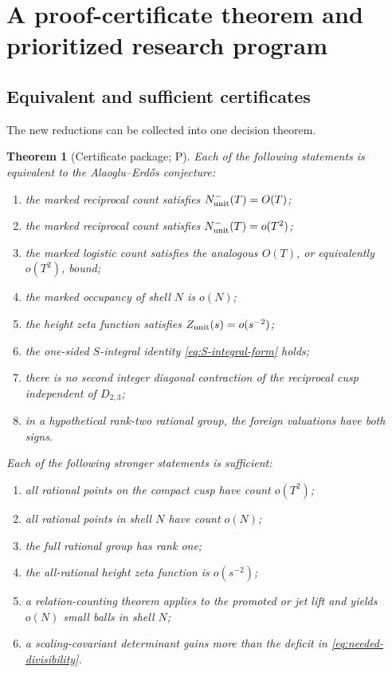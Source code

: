 \documentclass[10pt,oneside]{article}
\newtheorem{theorem}{Theorem}[section]
\theoremstyle{definition}
\theoremstyle{remark}
\newcommand{\statusP}{\textsc{P}}
\begin{document}
\section{A proof-certificate theorem and prioritized research program}
\label{sec:program}

\subsection{Equivalent and sufficient certificates}
The new reductions can be collected into one decision theorem.

\begin{theorem}[Certificate package; \statusP]
\label{thm:certificate-package}
Each of the following statements is equivalent to the Alaoglu--Erd\H{o}s conjecture:
\begin{enumerate}[label=\textup{(E\arabic*)}]
\item the marked reciprocal count satisfies \(N^-_{\rm unit}(T)=O(T)\);
\item the marked reciprocal count satisfies \(N^-_{\rm unit}(T)=o(T^2)\);
\item the marked logistic count satisfies the analogous \(O(T)\), or equivalently \(o(T^2)\), bound;
\item the marked occupancy of shell \(N\) is \(o(N)\);
\item the height zeta function satisfies \(Z_{\rm unit}(s)=o(s^{-2})\);
\item the one-sided \(S\)-integral identity \eqref{eq:S-integral-form} holds;
\item there is no second integer diagonal contraction of the reciprocal cusp independent of \(D_{2,3}\);
\item in a hypothetical rank-two rational group, the foreign valuations have both signs.
\end{enumerate}
Each of the following stronger statements is sufficient:
\begin{enumerate}[label=\textup{(S\arabic*)}]
\item all rational points on the compact cusp have count \(o(T^2)\);
\item all rational points in shell \(N\) have count \(o(N)\);
\item the full rational group has rank one;
\item the all-rational height zeta function is \(o(s^{-2})\);
\item a relation-counting theorem applies to the promoted or jet lift and yields \(o(N)\) small balls in shell \(N\);
\item a scaling-covariant determinant gains more than the deficit in \eqref{eq:needed-divisibility}.
\end{enumerate}
\end{theorem}
\end{document}
